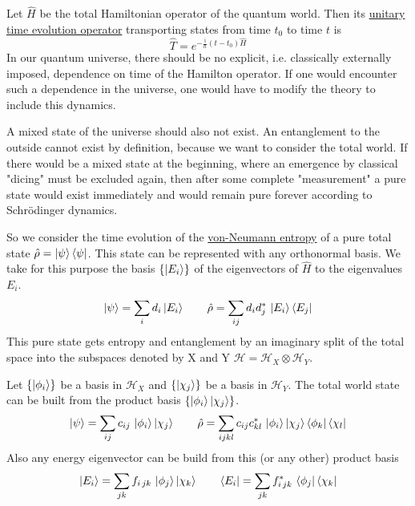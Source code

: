 \documentclass[12pt]{article}
\begin{document}
Let $\hat{H}$ be the total Hamiltonian operator of the quantum world. Then its \href{https://de.wikipedia.org/wiki/Zeitentwicklungsoperator}{unitary time evolution operator} transporting states from time $t_0$ to time $t$ is
\begin{equation}
\label{eq:propagator}
\hat{T}=e^{-\frac{\mathrm i}{\hbar}(t-t_0)\hat{H}}
\end{equation}
In our quantum universe, there should be no explicit, i.e. classically externally imposed, dependence on time of the Hamilton operator. If one would encounter such a dependence in the universe, one would have to modify the theory to include this dynamics.

A mixed state of the universe should also not exist. An entanglement to the outside cannot exist by definition, because we want to consider the total world. If there would be a mixed state at the beginning, where an emergence by classical "dicing" must be excluded again, then after some complete "measurement" a pure state would exist immediately and would remain pure forever according to Schrödinger dynamics. 

So we consider the time evolution of the \href{https://de.wikipedia.org/wiki/Entropie#Von-Neumann-Entropie}{von-Neumann entropy} of a pure total state $\hat{\rho}=\ket{\psi}\bra{\psi}$. This state can be represented with any orthonormal basis. We take for this purpose the basis $\{\ket{E_i}\}$ of the eigenvectors of $\hat{H}$ to the eigenvalues $E_i$.
\begin{equation}
\label{eq:psi_energy}
\ket{\psi}=\sum_{i}d_{i}\ket{E_i} \quad\quad
\hat{\rho}=\sum_{ij}d_{i}d_{j}^*\, \ket{E_i}\bra{E_j}
\end{equation}
This pure state gets entropy and entanglement by an imaginary split of the total space into the subspaces denoted by X and Y $\mathscr{H} = \mathscr{H}
_X\otimes\mathscr{H}_Y$.

Let $\{\ket{\phi_i}\}$ be a basis in $\mathscr{H}_X$ and $\{\ket{\chi_j}\}$ be a basis in $\mathscr{H}_Y$. The total world state can be built from the product basis $\{\ket{\phi_i}\ket{\chi_j}\}$.
\begin{equation}
\label{eq:psi_product}
\ket{\psi}=\sum_{ij}c_{ij}\, \ket{\phi_i}\ket{\chi_j} \quad\quad
\hat{\rho}=\sum_{ijkl}c_{ij}c_{kl}^*\, \ket{\phi_i}\ket{\chi_j}\bra{\phi_k}\bra{\chi_l}
\end{equation}
Also any energy eigenvector can be build from this (or any other) product basis
\begin{equation}
\label{eq:energy_eigenvector}
\ket{E_i}=\sum_{jk}f_{i\,jk}\, \ket{\phi_j}\ket{\chi_k}
\quad\quad
\bra{E_i}=\sum_{jk}f_{i\,jk}^*\, \bra{\phi_j}\bra{\chi_k}
\end{equation}
\end{document}
